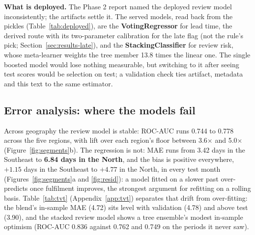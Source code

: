 \textbf{What is deployed.} The Phase 2 report named the deployed review model
inconsistently; the artifacts settle it. The served models, read back from the pickles
(Table~\ref{tab:deployed}), are the \textbf{VotingRegressor} for lead time, the
derived route with its two-parameter calibration for the late flag (not the
rule's pick; Section~\ref{sec:results-late}), and the \textbf{StackingClassifier}
for review risk, whose meta-learner weights the tree member 13.8 times the linear
one. The single boosted model would lose nothing measurable, but switching to it
after seeing test scores would be selection on test; a validation check ties
artifact, metadata and this text to the same estimator.

\subsection{Error analysis: where the models fail}
\label{sec:results-segments}

Across geography the review model is stable: ROC-AUC runs 0.744 to 0.778 across
the five regions, with lift over each region's floor between 3.6$\times$ and
5.0$\times$ (Figure~\ref{fig:segments}b). The regression is not: MAE runs from
3.42 days in the Southeast to \textbf{6.84 days in the North}, and the bias is
positive everywhere, $+1.15$ days in the Southeast to $+4.77$ in the North, in
every test month (Figures~\ref{fig:segments}a and \ref{fig:resid}): a model
fitted on a slower past over-predicts once fulfilment improves, the strongest
argument for refitting on a rolling basis. Table~\ref{tab:tvt}
(Appendix~\ref{app:tvt}) separates that drift from over-fitting: the blend's
in-sample MAE (4.72) sits level with validation (4.78) and above test (3.90), and
the stacked review model shows a tree ensemble's modest in-sample optimism
(ROC-AUC 0.836 against 0.762 and 0.749 on the periods it never saw).
